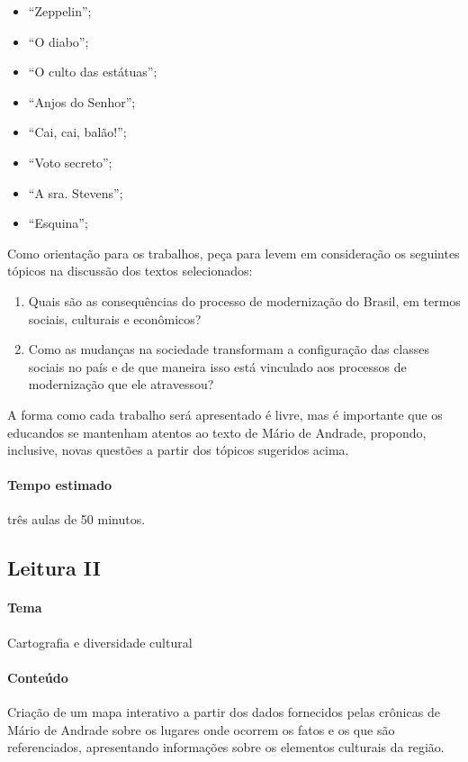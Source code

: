 \documentclass[12pt]{extarticle}
\begin{document}
\begin{enumerate}
\begin{itemize}
\item
  ``Zeppelin'';
\item
  ``O diabo'';
\item
  ``O culto das estátuas'';
\item
  ``Anjos do Senhor'';
\item
  ``Cai, cai, balão!'';
\item
  ``Voto secreto'';
\item
  ``A sra. Stevens'';
\item
  ``Esquina'';
\end{itemize}
\end{enumerate}

Como orientação para os trabalhos, peça para levem em consideração os
seguintes tópicos na discussão dos textos selecionados:

\begin{enumerate}
\item
  Quais são as consequências do processo de modernização do Brasil, em
  termos sociais, culturais e econômicos?
\item
  Como as mudanças na sociedade transformam a configuração das classes
  sociais no país e de que maneira isso está vinculado aos processos de
  modernização que ele atravessou?
\end{enumerate}

A forma como cada trabalho será apresentado é livre, mas é importante
que os educandos se mantenham atentos ao texto de Mário de Andrade,
propondo, inclusive, novas questões a partir dos tópicos sugeridos
acima.

\paragraph{Tempo estimado} três aulas de 50 minutos.

\subsection{Leitura II}


\paragraph{Tema} Cartografia e diversidade cultural

\paragraph{Conteúdo} Criação de um mapa interativo a partir dos dados
fornecidos pelas crônicas de Mário de Andrade sobre os lugares onde
ocorrem os fatos e os que são referenciados, apresentando informações
sobre os elementos culturais da região.
\end{document}
